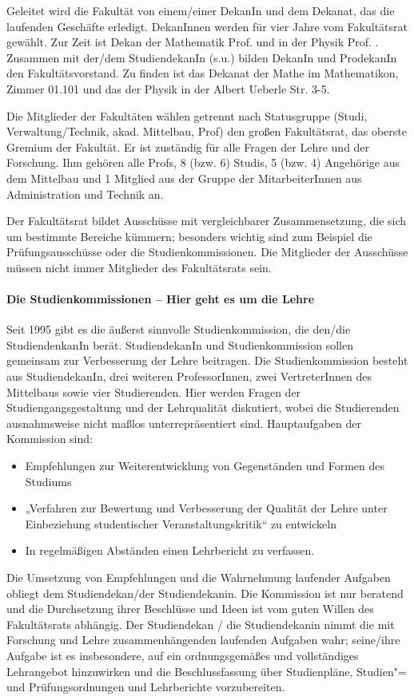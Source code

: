 Geleitet wird die Fakultät von einem/einer DekanIn und dem Dekanat, das die
laufenden Geschäfte erledigt. DekanInnen werden für vier Jahre vom Fakultätsrat
gewählt. Zur Zeit ist Dekan der Mathematik Prof. \dekanmathe{} und in der
Physik Prof. \dekanphysik. Zusammen mit der/dem StudiendekanIn (s.u.) bilden
DekanIn und ProdekanIn den Fakultätsvorstand. Zu finden ist das Dekanat der
Mathe im \Gls{Mathematikon}, Zimmer 01.101 und das der Physik in der Albert
Ueberle Str. 3-5.

Die Mitglieder der Fakultäten wählen getrennt nach Statusgruppe (Studi,
Verwaltung/Technik, akad. Mittelbau, Prof) den großen Fakultätsrat, das oberste
Gremium der Fakultät. Er ist zuständig für alle Fragen der Lehre und der
Forschung. Ihm gehören alle Profs, 8 (bzw. 6) Studis, 5 (bzw. 4) Angehörige aus
dem Mittelbau und 1 Mitglied aus der Gruppe der MitarbeiterInnen aus
Administration und Technik an.

Der Fakultätsrat bildet Ausschüsse mit vergleichbarer Zusammensetzung, die sich
um bestimmte Bereiche kümmern; besonders wichtig sind zum Beispiel die
Prüfungsausschüsse oder die Studienkommissionen. Die Mitglieder der Ausschüsse
müssen nicht immer Mitglieder des Fakultätsrats sein.


\paragraph{Die Studienkommissionen -- Hier geht es um die Lehre}

Seit 1995 gibt es die äußerst sinnvolle Studienkommission, die den/die
StudiendenkanIn berät. StudiendekanIn und Studienkommission sollen gemeinsam
zur Verbesserung der Lehre beitragen. Die Studienkommission besteht aus
StudiendekanIn, drei weiteren ProfessorInnen, zwei VertreterInnen des
Mittelbaus sowie vier Studierenden. Hier werden Fragen der
Studiengangsgestaltung und der Lehrqualität diskutiert, wobei die Studierenden
ausnahmsweise nicht maßlos unterrepräsentiert sind. Hauptaufgaben der
Kommission sind:
\begin{itemize}
    \addtolength{\itemsep}{-0.7\baselineskip}
    \item Empfehlungen zur Weiterentwicklung von Gegenständen und Formen des Studiums
    \item „Verfahren zur Bewertung und Verbesserung  der Qualität der Lehre unter
          Einbeziehung studentischer Veranstaltungskritik“ zu entwickeln
    \item In regelmäßigen Abständen einen Lehrbericht zu verfassen.
\end{itemize}

Die Umsetzung von Empfehlungen und die Wahrnehmung laufender Aufgaben obliegt
dem Studiendekan/der Studiendekanin. Die Kommission ist nur beratend und die
Durchsetzung ihrer Beschlüsse und Ideen ist vom guten Willen des Fakultätsrats
abhängig. Der Studiendekan / die Studiendekanin nimmt die mit Forschung und
Lehre zusammenhängenden laufenden Aufgaben wahr; seine/ihre Aufgabe ist es
insbesondere, auf ein ordnungsgemäßes und vollständiges Lehrangebot hinzuwirken
und die Beschlussfassung über Studienpläne, Studien"= und Prüfungsordnungen und
Lehrberichte vorzubereiten.
